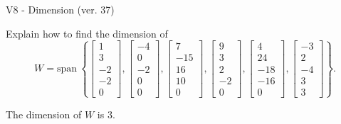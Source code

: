 \begin{exercise}
  \begin{exerciseTitle}V8 - Dimension (ver. 37)\end{exerciseTitle}
  \begin{exerciseStatement}
    Explain how to find the dimension of 
\[W=\mathrm{span}\ \left\{\left[\begin{array}{r}
1 \\
3 \\
-2 \\
-2 \\
0
\end{array}\right] , \left[\begin{array}{r}
-4 \\
0 \\
-2 \\
0 \\
0
\end{array}\right] , \left[\begin{array}{r}
7 \\
-15 \\
16 \\
10 \\
0
\end{array}\right] , \left[\begin{array}{r}
9 \\
3 \\
2 \\
-2 \\
0
\end{array}\right] , \left[\begin{array}{r}
4 \\
24 \\
-18 \\
-16 \\
0
\end{array}\right] , \left[\begin{array}{r}
-3 \\
2 \\
-4 \\
3 \\
3
\end{array}\right]\right\}.\]



  \end{exerciseStatement}
  \begin{exerciseAnswer}
   The dimension of \(W\) is  \(3\).
  


  \end{exerciseAnswer}
\end{exercise}